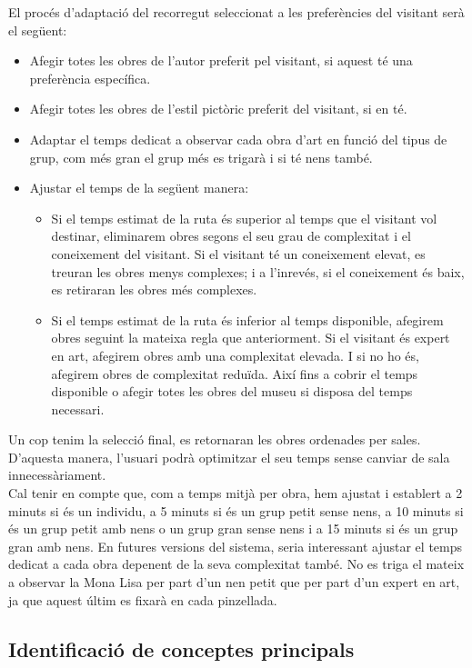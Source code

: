 \documentclass[a4paper]{article}
\begin{document}
	El procés d'adaptació del recorregut seleccionat a les preferències del visitant serà el següent:
	\begin{itemize}
		\item Afegir totes les obres de l'autor preferit pel visitant, si aquest té una preferència específica.
		\item Afegir totes les obres de l'estil pictòric preferit del visitant, si en té.
		\item Adaptar el temps dedicat a observar cada obra d'art en funció del tipus de grup, com més gran el grup més es trigarà i si té nens també.
		\item Ajustar el temps de la següent manera: 
		\begin{itemize}
			\item Si el temps estimat de la ruta és superior al temps que el visitant vol destinar, eliminarem obres segons el seu grau de complexitat i el coneixement del visitant. Si el visitant té un coneixement elevat, es treuran les obres menys complexes; i a l'inrevés, si el coneixement és baix, es retiraran les obres més complexes.
			\item Si el temps estimat de la ruta és inferior al temps disponible, afegirem obres seguint la mateixa regla que anteriorment. Si el visitant és expert en art, afegirem obres amb una complexitat elevada. I si no ho és, afegirem obres de complexitat reduïda. Així fins a cobrir el temps disponible o afegir totes les obres del museu si disposa del temps necessari.
		\end{itemize}
	\end{itemize}
	
	Un cop tenim la selecció final, es retornaran les obres ordenades per sales. D'aquesta manera, l'usuari podrà optimitzar el seu temps sense canviar de sala innecessàriament. \\
	
	Cal tenir en compte que, com a temps mitjà per obra, hem ajustat i establert a 2 minuts si és un individu, a 5 minuts si és un grup petit sense nens, a 10 minuts si és un grup petit amb nens o un grup gran sense nens i a 15 minuts si és un grup gran amb nens. En futures versions del sistema, seria interessant ajustar el temps dedicat a cada obra depenent de la seva complexitat també. No es triga el mateix a observar la Mona Lisa per part d'un nen petit que per part d'un expert en art, ja que aquest últim es fixarà en cada pinzellada.
	
	\subsection{Identificació de conceptes principals}
	
\end{document}
